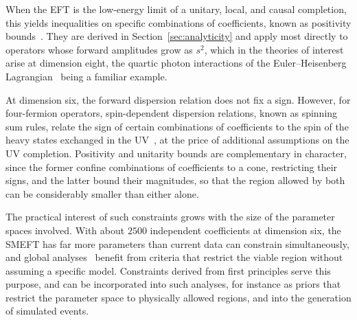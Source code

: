 When
the EFT is the low-energy limit of a unitary, local, and causal completion, this yields inequalities
on specific combinations of coefficients, known as positivity
bounds~\cite{Pham:1985cr,Ananthanarayan:1994hf,Adams:2006sv}. They are derived in
Section~\ref{sec:analyticity} and apply most directly to operators whose forward amplitudes grow as
$s^2$, which in the theories of interest arise at dimension eight, the quartic photon interactions
of the Euler--Heisenberg Lagrangian~\cite{Heisenberg:1936nmg} being a familiar example. 

At dimension
six, the forward dispersion relation does not fix a sign. However, for four-fermion operators,
spin-dependent dispersion relations, known as spinning sum rules, relate the sign of certain
combinations of coefficients to the spin of the heavy states exchanged in the
UV~\cite{Remmen:2020uze,Remmen:2022orj,Gu:2020thj,Azatov:2021ygj}, at the price of additional
assumptions on the UV completion. Positivity and unitarity bounds are complementary in character,
since the former confine combinations of coefficients to a cone, restricting their signs, and the
latter bound their magnitudes, so that the region allowed by both can be considerably smaller than
either alone.




The practical interest of such constraints grows with the size of the parameter spaces involved.
With about $2500$ independent coefficients at dimension six, the SMEFT has far more parameters than
current data can constrain simultaneously, and global
analyses~\cite{Brivio:2019ius,Ellis:2020unq,Ethier:2021bye,Celada:2024mcf} benefit from criteria
that restrict the viable region without assuming a specific model. Constraints derived from first
principles serve this purpose, and can be incorporated into such analyses, for instance as priors
that restrict the parameter space to physically allowed regions, and into the generation of
simulated events.


